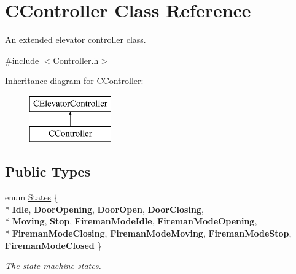 \hypertarget{class_c_controller}{\section{C\+Controller Class Reference}
\label{class_c_controller}
}


An extended elevator controller class.  




{\ttfamily \#include $<$Controller.\+h$>$}

Inheritance diagram for C\+Controller\+:\begin{figure}[H]
\begin{center}
\leavevmode
\includegraphics[height=2.000000cm]{class_c_controller}
\end{center}
\end{figure}
\subsection*{Public Types}
\begin{DoxyCompactItemize}
\item 
\hypertarget{class_c_controller_a4c332e7b3c3035cdde7b8f344b565429}{enum \hyperlink{class_c_controller_a4c332e7b3c3035cdde7b8f344b565429}{States} \{ \\*
{\bfseries Idle}, 
{\bfseries Door\+Opening}, 
{\bfseries Door\+Open}, 
{\bfseries Door\+Closing}, 
\\*
{\bfseries Moving}, 
{\bfseries Stop}, 
{\bfseries Fireman\+Mode\+Idle}, 
{\bfseries Fireman\+Mode\+Opening}, 
\\*
{\bfseries Fireman\+Mode\+Closing}, 
{\bfseries Fireman\+Mode\+Moving}, 
{\bfseries Fireman\+Mode\+Stop}, 
{\bfseries Fireman\+Mode\+Closed}
 \}}\label{class_c_controller_a4c332e7b3c3035cdde7b8f344b565429}

\begin{DoxyCompactList}\small\item\em The state machine states. \end{DoxyCompactList}\end{DoxyCompactItemize}

